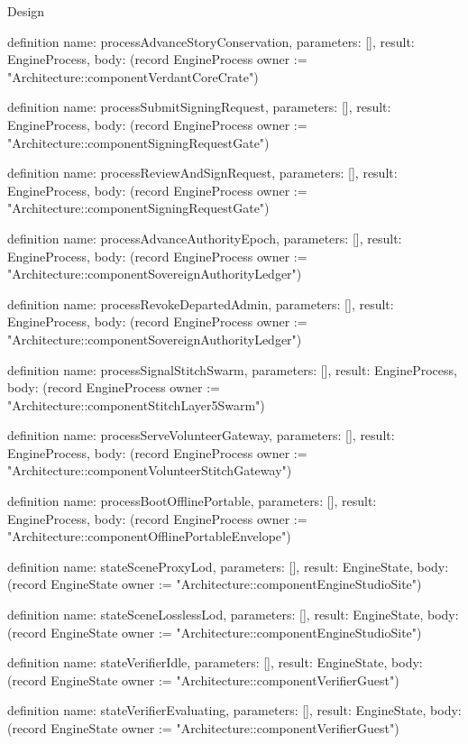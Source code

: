 \begin{lexlean}{Design}
\begin{semanticmodule}
definition{
  name: processAdvanceStoryConservation,
  parameters: [],
  result: EngineProcess,
  body: (record EngineProcess {owner := "Architecture::componentVerdantCoreCrate"})
}

definition{
  name: processSubmitSigningRequest,
  parameters: [],
  result: EngineProcess,
  body: (record EngineProcess {owner := "Architecture::componentSigningRequestGate"})
}

definition{
  name: processReviewAndSignRequest,
  parameters: [],
  result: EngineProcess,
  body: (record EngineProcess {owner := "Architecture::componentSigningRequestGate"})
}

definition{
  name: processAdvanceAuthorityEpoch,
  parameters: [],
  result: EngineProcess,
  body: (record EngineProcess {owner := "Architecture::componentSovereignAuthorityLedger"})
}

definition{
  name: processRevokeDepartedAdmin,
  parameters: [],
  result: EngineProcess,
  body: (record EngineProcess {owner := "Architecture::componentSovereignAuthorityLedger"})
}

definition{
  name: processSignalStitchSwarm,
  parameters: [],
  result: EngineProcess,
  body: (record EngineProcess {owner := "Architecture::componentStitchLayer5Swarm"})
}

definition{
  name: processServeVolunteerGateway,
  parameters: [],
  result: EngineProcess,
  body: (record EngineProcess {owner := "Architecture::componentVolunteerStitchGateway"})
}

definition{
  name: processBootOfflinePortable,
  parameters: [],
  result: EngineProcess,
  body: (record EngineProcess {owner := "Architecture::componentOfflinePortableEnvelope"})
}

definition{
  name: stateSceneProxyLod,
  parameters: [],
  result: EngineState,
  body: (record EngineState {owner := "Architecture::componentEngineStudioSite"})
}

definition{
  name: stateSceneLosslessLod,
  parameters: [],
  result: EngineState,
  body: (record EngineState {owner := "Architecture::componentEngineStudioSite"})
}

definition{
  name: stateVerifierIdle,
  parameters: [],
  result: EngineState,
  body: (record EngineState {owner := "Architecture::componentVerifierGuest"})
}

definition{
  name: stateVerifierEvaluating,
  parameters: [],
  result: EngineState,
  body: (record EngineState {owner := "Architecture::componentVerifierGuest"})
}


\end{semanticmodule}
\end{lexlean}
